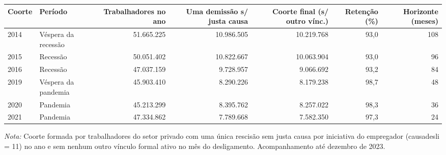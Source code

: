 \providecommand{\toprule}{\hline\hline}
\providecommand{\midrule}{\hline}
\providecommand{\bottomrule}{\hline\hline}
\providecommand{\addlinespace}[1][]{}
{\small
\renewcommand{\arraystretch}{1.12}
\begin{tabular}{llrrrrr}
\toprule
Coorte & Período & Trabalhadores no ano & Uma demissão s/ justa causa & Coorte final (s/ outro vínc.) & Retenção (\%) & Horizonte (meses) \\
\midrule
2014 & Véspera da recessão & 51.665.225 & 10.986.505 & 10.219.768 & 93,0 & 108 \\
2015 & Recessão & 50.051.402 & 10.822.667 & 10.063.904 & 93,0 & 96 \\
2016 & Recessão & 47.037.159 & 9.728.957 & 9.066.692 & 93,2 & 84 \\
2019 & Véspera da pandemia & 45.903.410 & 8.290.226 & 8.179.238 & 98,7 & 48 \\
2020 & Pandemia & 45.213.299 & 8.395.762 & 8.257.022 & 98,3 & 36 \\
2021 & Pandemia & 47.334.862 & 7.789.668 & 7.582.350 & 97,3 & 24 \\
\bottomrule
\end{tabular}
\vspace{2pt}
\par{\footnotesize \textit{Nota:} Coorte formada por trabalhadores do setor privado com uma única rescisão sem justa causa por iniciativa do empregador (causadesli = 11) no ano e sem nenhum outro vínculo formal ativo no mês do desligamento. Acompanhamento até dezembro de 2023.}
}
